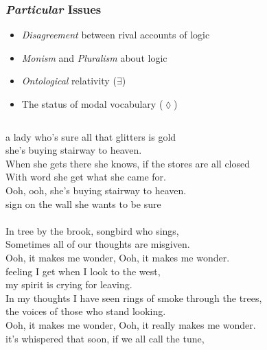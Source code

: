 \documentclass{beamer} %
\def\Dia{\lozenge}
\begin{document}
\begin{frame}\frametitle{\emph{Particular} Issues}\Large
\begin{itemize}
\item<+-> \emph{Disagreement} between rival accounts of logic
\item<+-> \emph{Monism} and \emph{Pluralism} about logic
\item<+-> \emph{Ontological} relativity ($\exists$)
\item<+-> The status of modal vocabulary ($\Dia$)
\end{itemize}
\end{frame}
\def\isand#1{{\color<2,7>{red}{#1}}} %
\def\isnot#1{{\color<3,7>{red}{#1}}} %
\def\issome#1{{\color<4,7>{red}{#1}}} %
\def\isposs#1{{\color<5,7>{red}{#1}}} %
\def\punchline#1{{\color<6>{red}{#1}}}
\begin{frame}\footnotesize%
\begin{columns}
\column{5cm}
\issome{There's} a lady who's sure all that glitters is gold \\
\isand{And} she's buying \issome{a} stairway to heaven.\\
When she gets there she knows, if the stores are all closed\\
With \issome{a} word she \isposs{can} get what she came for.\\
Ooh, ooh, \isand{and} she's buying \issome{a} stairway to heaven.\\[4mm]
\issome{There's a} sign on the wall \isand{but} she wants to be sure\\
\punchline{'Cause you know sometimes words have two meanings.}\\
In \issome{a} tree by the brook, \issome{there's a} songbird who sings,\\
Sometimes all of our thoughts are misgiven.\\[4mm]
Ooh, it makes me wonder, Ooh, it makes me wonder.\\[4mm]
\issome{There's a} feeling I get when I look to the west,\\
\isand{And} my spirit is crying for leaving.\\
In my thoughts I have seen rings of smoke through the trees,\\
\isand{And} the voices of those who stand looking.\\[4mm]
Ooh, it makes me wonder, Ooh, it really makes me wonder.\\[4mm]
\isand{And} it's whispered that soon, if we all call the tune,\\

\end{columns}
\end{frame}
\end{document}
